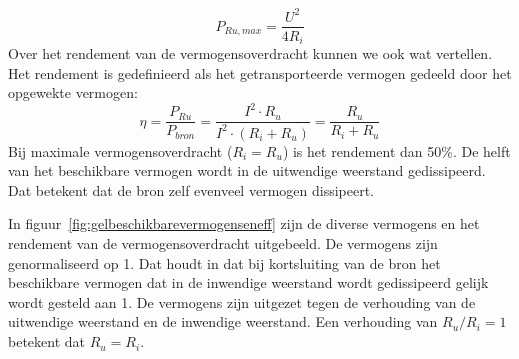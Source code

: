 %
\begin{equation}
P_{Ru,max} = \dfrac{U^2}{4R_i}
\end{equation}
%
Over het rendement van de vermogensoverdracht kunnen we ook wat vertellen. Het rendement is gedefinieerd
als het getransporteerde vermogen gedeeld door het opgewekte vermogen:
%
\begin{equation}
\eta = \dfrac{P_{Ru}}{P_{bron}} = \dfrac{I^2\cdot R_u}{I^2\cdot(R_i+R_u)} = \dfrac{R_u}{R_i+R_u}
\end{equation}
%
Bij maximale vermogensoverdracht ($R_i=R_u$) is het rendement dan 50\%. De helft van het beschikbare
vermogen wordt in de uitwendige weerstand gedissipeerd. Dat betekent dat de bron zelf evenveel vermogen
dissipeert.

In figuur~\ref{fig:gelbeschikbarevermogenseneff} zijn de diverse vermogens en het rendement van de
vermogensoverdracht uitgebeeld. De vermogens zijn genormaliseerd op 1. Dat houdt in dat bij
kortsluiting van de bron het beschikbare vermogen dat in de inwendige weerstand wordt gedissipeerd
gelijk wordt gesteld aan 1. De vermogens zijn uitgezet tegen de verhouding van de uitwendige weerstand
en de inwendige weerstand. Een verhouding van $R_u/R_i=1$ betekent dat $R_u=R_i$.


